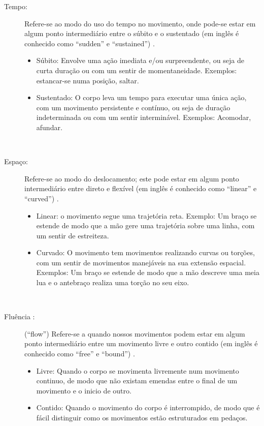 \begin{description}
\item[Tempo:] Refere-se ao modo do uso do tempo no movimento,
onde pode-se estar em algum ponto intermediário entre o súbito e o sustentado 
(em inglês é conhecido como    ``sudden'' e ``sustained'') 
\cite[pp. 143]{laban1987dominio} \cite[pp. 5]{carline2011lesson} \cite[pp. 28]{elementosdanca2017}.
\begin{itemize}
\item Súbito: Envolve uma ação imediata e/ou surpreendente, ou seja de curta duração
ou com um sentir de momentaneidade. Exemplos: estancar-se numa posição, saltar.
\item Sustentado: O corpo leva um tempo para executar uma única ação, 
com um movimento persistente e contínuo, ou seja de duração indeterminada ou com um sentir interminável.  
Exemplos: Acomodar, afundar.
\end{itemize}~
\end{description}

\begin{description}
\item[Espaço:] Refere-se ao modo do deslocamento;
este pode estar em algum ponto intermediário entre  direto  e  flexível 
(em inglês é conhecido como  ``linear'' e ``curved'') 
\cite[pp. 143]{laban1987dominio} \cite[pp. 6]{carline2011lesson} \cite[pp. 28]{elementosdanca2017}.
\begin{itemize}
\item Linear: o movimento segue uma trajetória reta. Exemplo:
Um braço se estende de modo que a mão gere uma trajetória sobre uma linha,
com um sentir de estreiteza.
\item Curvado: O movimento tem movimentos realizando curvas ou torções,
com um sentir de movimentos manejáveis na sua extensão espacial. 
Exemplos: Um braço se estende de modo que a mão descreve uma meia lua e o antebraço realiza uma torção no seu eixo.
\end{itemize}~
\item[Fluência :] (``flow'') Refere-se a quando nossos movimentos podem 
estar em algum ponto intermediário entre um movimento livre  e outro contido 
(em inglês é conhecido como   ``free'' e ``bound'')
\cite[pp. 140-143]{laban1987dominio} \cite[pp. 6]{carline2011lesson} \cite[pp. 27]{elementosdanca2017}.
\begin{itemize}
\item Livre: Quando o corpo se movimenta livremente num movimento continuo,
de modo que não existam emendas entre o final de um movimento e o inicio de outro.
\item Contido: Quando o movimento do corpo é interrompido,
de modo que é fácil distinguir como os movimentos estão estruturados em pedaços.
\end{itemize}~
\end{description}

